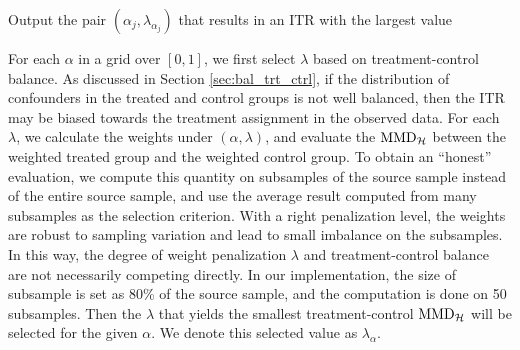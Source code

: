\documentclass[12pt]{article}
\begin{document}
\bigskip

\begin{algorithm}[H]
	\SetAlgoNoLine
	Output the pair $(\alpha_j,\lambda_{\alpha_j})$ that results in an ITR with the largest value 
	\caption{Tuning parameter selection procedure}
	\label{alg:alg1}
\end{algorithm}

\bigskip

For each $\alpha$ in a grid over $[0, 1]$, we first select $\lambda$ based on treatment-control balance. As discussed in Section \ref{sec:bal_trt_ctrl}, if the distribution of confounders in the treated and control groups is not well balanced, then the ITR may be biased towards the treatment assignment in the observed data. For each $\lambda$, we calculate the weights under $(\alpha, \lambda)$, and evaluate the $\textnormal{MMD}_\mathcal{H}$ between the weighted treated group and the weighted control group. To obtain an ``honest'' evaluation, we compute this quantity on subsamples of the source sample instead of the entire source sample, and use the average result computed from many subsamples as the selection criterion. With a right penalization level, the weights are robust to sampling variation and lead to small imbalance on the subsamples. In this way, the degree of weight penalization $\lambda$ and treatment-control balance are not necessarily competing directly. In our implementation, the size of subsample is set as 80\% of the source sample, and the computation is done on 50 subsamples. Then the $\lambda$ that yields the smallest treatment-control $\textnormal{MMD}_\mathcal{H}$ will be selected for the given $\alpha$. We denote this selected value as $\lambda_\alpha$.
\end{document}

